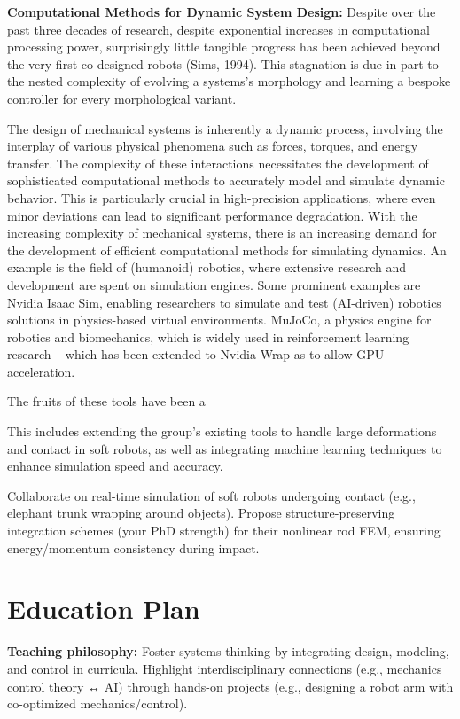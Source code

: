 \documentclass[12pt]{article}
\begin{document}
\hspace{5mm} \textbf{Computational Methods for Dynamic System Design:} 
Despite over the past three decades of research, despite exponential increases in computational processing power, surprisingly little tangible progress has been achieved beyond the very first co-designed robots (Sims, 1994). This stagnation is due in part to the nested complexity of evolving a systems’s morphology and learning a bespoke controller for every morphological variant.

The design of mechanical systems is inherently a dynamic process, involving the interplay of various physical phenomena such as forces, torques, and energy transfer. The complexity of these interactions necessitates the development of sophisticated computational methods to accurately model and simulate dynamic behavior. This is particularly crucial in high-precision applications, where even minor deviations can lead to significant performance degradation.
With the increasing complexity of mechanical systems, there is an increasing demand for the development of efficient computational methods for simulating dynamics. An example is the field of (humanoid) robotics, where extensive research and development are spent on simulation engines. Some prominent examples are Nvidia Isaac Sim, enabling researchers to simulate and test (AI-driven) robotics solutions in physics-based virtual environments. MuJoCo, a physics engine for robotics and biomechanics, which is widely used in reinforcement learning research -- which has been extended to Nvidia Wrap as to allow GPU acceleration. 

The fruits of these tools have been a 

This includes extending the group’s existing tools to handle large deformations and contact in soft robots, as well as integrating machine learning techniques to enhance simulation speed and accuracy.

Collaborate on real-time simulation of soft robots undergoing contact (e.g., elephant trunk wrapping around objects). Propose structure-preserving integration schemes (your PhD strength) for their nonlinear rod FEM, ensuring energy/momentum consistency during impact.

\section*{Education Plan}

\hspace{5mm} \textbf{Teaching philosophy:} Foster systems thinking by integrating design, modeling, and control in curricula. Highlight interdisciplinary connections (e.g., mechanics  control theory ↔ AI) through hands-on projects (e.g., designing a robot arm with co-optimized mechanics/control).
\end{document}
